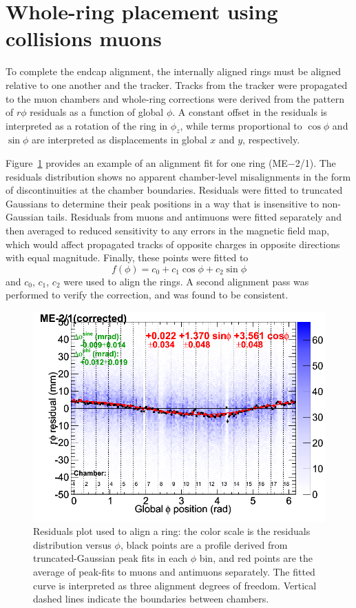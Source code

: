\documentclass[12pt]{article}
\begin{document}
\section{Whole-ring placement using collisions muons}

To complete the endcap alignment, the internally aligned rings must be
aligned relative to one another and the tracker.  Tracks from the
tracker were propagated to the muon chambers and whole-ring
corrections were derived from the pattern of $r\phi$ residuals as a
function of global $\phi$.  A constant offset in the residuals is
interpreted as a rotation of the ring in $\phi_z$, while terms
proportional to $\cos\phi$ and $\sin\phi$ are interpreted as
displacements in global $x$ and $y$, respectively.

Figure~\ref{fig:one_and_only_mapplot} provides an example of an
alignment fit for one ring (ME$-$2/1).  The residuals distribution
shows no apparent chamber-level misalignments in the form of
discontinuities at the chamber boundaries.  Residuals were fitted to
truncated Gaussians to determine their peak positions in a way that is
insensitive to non-Gaussian tails.  Residuals from muons and antimuons
were fitted separately and then averaged to reduced sensitivity to any
errors in the magnetic field map, which would affect propagated tracks
of opposite charges in opposite directions with equal magnitude.
Finally, these points were fitted to
\begin{equation}
f(\phi) = c_0 + c_1 \cos\phi + c_2 \sin\phi
\end{equation}
and $c_0$, $c_1$, $c_2$ were used to align the rings.  A second
alignment pass was performed to verify the correction, and was found
to be consistent.

\begin{figure}
\begin{center}
\includegraphics[width=0.5\linewidth]{one_and_only_mapplot.png}
\end{center}

\caption{Residuals plot used to align a ring: the color scale is the
  residuals distribution versus $\phi$, black points are a profile
  derived from truncated-Gaussian peak fits in each $\phi$ bin, and
  red points are the average of peak-fits to muons and antimuons
  separately.  The fitted curve is interpreted as three alignment
  degrees of freedom.  Vertical dashed lines indicate the boundaries
  between chambers. \label{fig:one_and_only_mapplot}}
\end{figure}
\end{document}

